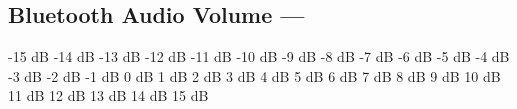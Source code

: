 \subsection[Bluetooth Audio Volume]{Bluetooth Audio Volume --- \UiKey{\SET}}


























-15 dB
-14 dB
-13 dB
-12 dB
-11 dB
-10 dB
-9 dB
-8 dB
-7 dB
-6 dB
-5 dB
-4 dB
-3 dB
-2 dB
-1 dB
0 dB
1 dB
2 dB
3 dB
4 dB
5 dB
6 dB
7 dB
8 dB
9 dB
10 dB
11 dB
12 dB
13 dB
14 dB
15 dB

